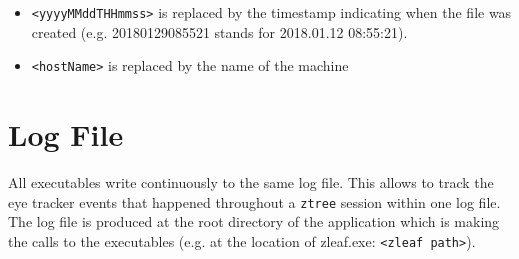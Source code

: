 \documentclass[a4paper,oneside]{book}
\begin{document}
\begin{itemize}
    \item \texttt{<yyyyMMddTHHmmss>} is replaced by the timestamp indicating when the file was created (e.g. 20180129085521 stands for 2018.01.12 08:55:21).
    \item \texttt{<hostName>} is replaced by the name of the machine
\end{itemize}


\section{Log File}
All executables write continuously to the same log file.
This allows to track the eye tracker events that happened throughout a \texttt{ztree} session within one log file.
The log file is produced at the root directory of the application which is making the calls to the executables (e.g. at the location of zleaf.exe: \texttt{<zleaf path>}).
\end{document}
